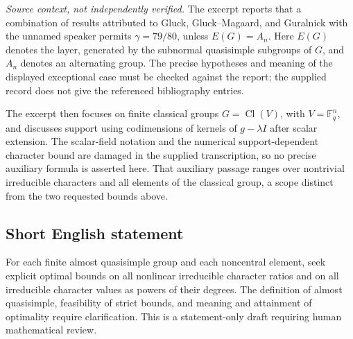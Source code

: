 \documentclass[11pt]{article}
\newcommand{\F}{\mathbb{F}}
\begin{document}
\emph{Source context, not independently verified.} The excerpt reports that a combination of results attributed to Gluck, Gluck--Magaard, and Guralnick with the unnamed speaker permits \(\gamma=79/80\), unless \(E(G)=A_n\). Here \(E(G)\) denotes the layer, generated by the subnormal quasisimple subgroups of \(G\), and \(A_n\) denotes an alternating group. The precise hypotheses and meaning of the displayed exceptional case must be checked against the report; the supplied record does not give the referenced bibliography entries.

The excerpt then focuses on finite classical groups \(G=\operatorname{Cl}(V)\), with \(V=\F_q^n\), and discusses support using codimensions of kernels of \(g-\lambda I\) after scalar extension. The scalar-field notation and the numerical support-dependent character bound are damaged in the supplied transcription, so no precise auxiliary formula is asserted here. That auxiliary passage ranges over nontrivial irreducible characters and all elements of the classical group, a scope distinct from the two requested bounds above.
\subsection{Short English statement}
For each finite almost quasisimple group and each noncentral element, seek explicit optimal bounds on all nonlinear irreducible character ratios and on all irreducible character values as powers of their degrees. The definition of almost quasisimple, feasibility of strict bounds, and meaning and attainment of optimality require clarification. This is a statement-only draft requiring human mathematical review.
\end{document}
